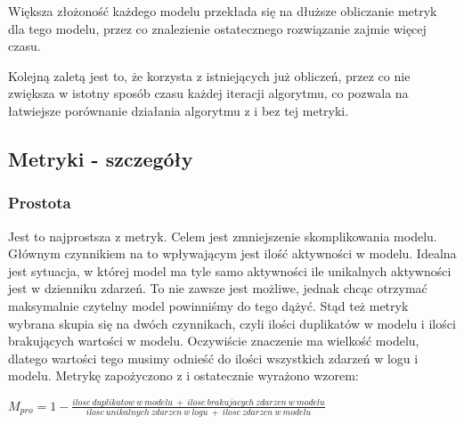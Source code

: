 Większa złożoność każdego modelu przekłada się na dłuższe obliczanie metryk dla tego modelu, przez co znalezienie ostatecznego rozwiązanie zajmie więcej czasu.

Kolejną zaletą jest to, że korzysta z istniejących już obliczeń, przez co nie zwiększa w istotny sposób czasu każdej iteracji algorytmu, co pozwala na łatwiejsze porównanie działania algorytmu z i bez tej metryki.

\subsection{Metryki - szczegóły}

\subsubsection{Prostota}  
Jest to najprostsza z metryk. Celem jest zmniejszenie skomplikowania modelu. Głównym czynnikiem na to wpływającym jest ilość aktywności w modelu. Idealna jest sytuacja, w której model ma tyle samo aktywności ile unikalnych aktywności jest w dzienniku zdarzeń. To nie zawsze jest możliwe, jednak chcąc otrzymać maksymalnie czytelny model powinniśmy do tego dążyć. Stąd też metryk wybrana skupia się na dwóch czynnikach, czyli ilości duplikatów w modelu i ilości brakujących wartości w modelu. Oczywiście znaczenie ma wielkość modelu, dlatego wartości tego  musimy odnieść do ilości wszystkich zdarzeń w logu i modelu. Metrykę zapożyczono z \cite{qd-in-discovery} i ostatecznie wyrażono wzorem: \begin{center}
$M_{pro} = 1 - \frac{ilosc\ duplikatow\ w\ modelu\ +\ ilosc\ brakujacych\ zdarzen\ w\ modelu}{ilosc\ unikalnych\ zdarzen\ w\ logu\ +\ ilosc\ zdarzen\ w\ modelu}$
\end{center}
